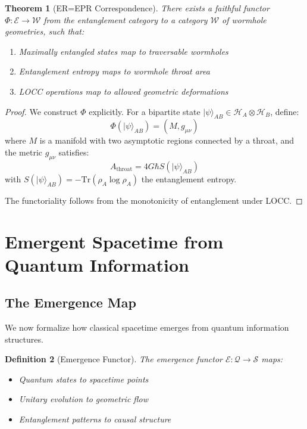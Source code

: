 \documentclass[11pt,a4paper]{article}
\newtheorem{theorem}{Theorem}[section]
\newtheorem{definition}[theorem]{Definition}
\begin{document}
\begin{theorem}[ER=EPR Correspondence]
There exists a faithful functor $\Phi: \mathcal{E} \to \mathcal{W}$ from the entanglement category to a category $\mathcal{W}$ of wormhole geometries, such that:
\begin{enumerate}
\item Maximally entangled states map to traversable wormholes
\item Entanglement entropy maps to wormhole throat area
\item LOCC operations map to allowed geometric deformations
\end{enumerate}
\end{theorem}

\begin{proof}
We construct $\Phi$ explicitly. For a bipartite state $|\psi\rangle_{AB} \in \mathcal{H}_A \otimes \mathcal{H}_B$, define:
\[
\Phi(|\psi\rangle_{AB}) = (M, g_{\mu\nu})
\]
where $M$ is a manifold with two asymptotic regions connected by a throat, and the metric $g_{\mu\nu}$ satisfies:
\[
A_{\text{throat}} = 4G\hbar S(|\psi\rangle_{AB})
\]
with $S(|\psi\rangle_{AB}) = -\text{Tr}(\rho_A \log \rho_A)$ the entanglement entropy.

The functoriality follows from the monotonicity of entanglement under LOCC.
\end{proof}

\section{Emergent Spacetime from Quantum Information}

\subsection{The Emergence Map}

We now formalize how classical spacetime emerges from quantum information structures.

\begin{definition}[Emergence Functor]
The emergence functor $\mathcal{E}: \mathcal{Q} \to \mathcal{S}$ maps:
\begin{itemize}
\item Quantum states to spacetime points
\item Unitary evolution to geometric flow
\item Entanglement patterns to causal structure
\end{itemize}
\end{definition}
\end{document}
